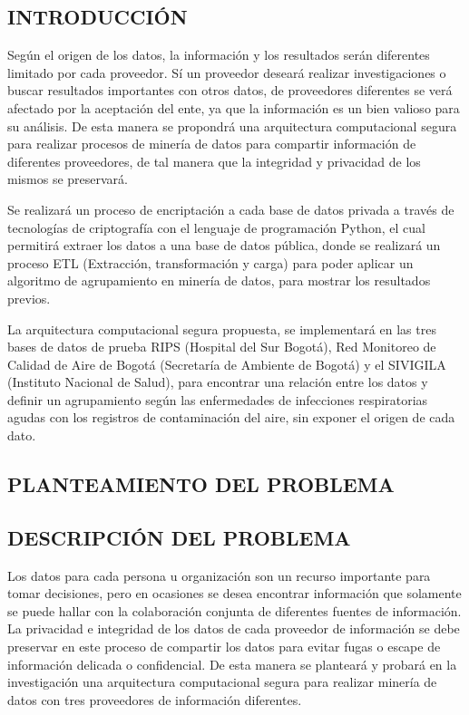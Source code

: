 \documentclass[a4paper, 11pt, oneside]{article}
\theoremstyle{definition}
\theoremstyle{remark}
\begin{document}
\begin{center}
 \section{INTRODUCCIÓN}
 \end{center}
 
Según el origen de los datos, la información y los resultados serán diferentes limitado por cada proveedor. Sí un proveedor deseará realizar investigaciones o buscar resultados importantes con otros datos, de proveedores diferentes se verá afectado por la aceptación del ente, ya que la información es un bien valioso para su análisis. De esta manera se propondrá una arquitectura computacional segura para realizar procesos de minería de datos para compartir información de diferentes proveedores, de tal manera que la integridad y privacidad de los mismos se preservará.

Se realizará un proceso de encriptación a cada base de datos privada a través de tecnologías de criptografía con el lenguaje de programación Python, el cual permitirá extraer los datos a una base de datos pública, donde se realizará un proceso ETL (Extracción, transformación y carga) para poder aplicar un algoritmo de agrupamiento en minería de datos, para mostrar los resultados previos.

La arquitectura computacional segura propuesta, se implementará en las tres bases de datos de prueba RIPS (Hospital del Sur Bogotá), Red Monitoreo de Calidad de Aire de Bogotá (Secretaría de Ambiente de Bogotá) y el SIVIGILA (Instituto Nacional de Salud), para encontrar una relación entre los datos y definir un agrupamiento según las enfermedades de infecciones respiratorias agudas con los registros de contaminación del aire, sin exponer el origen de cada dato.

\clearpage

\begin{center}
 \section{PLANTEAMIENTO DEL PROBLEMA}
 \end{center}

\subsection{DESCRIPCIÓN DEL PROBLEMA}

Los datos para cada persona u organización son un recurso importante para tomar decisiones, pero  en ocasiones se desea encontrar información que solamente se puede hallar con la colaboración conjunta de diferentes fuentes de información. La privacidad e integridad de los datos de cada proveedor de información se debe preservar en este proceso de compartir los datos para evitar fugas o escape de información delicada o confidencial. De esta manera se planteará y probará en la investigación una arquitectura computacional segura para realizar minería de datos con tres proveedores de información diferentes.
\end{document}
